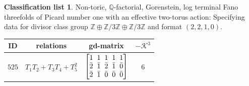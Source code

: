 \documentclass[pdftex]{sigma}%
\theoremstyle{definition}
\newtheorem{class-list}[thm]{Classification list}
\def\ZZ{{\mathbb Z}}
\def\QQ{{\mathbb Q}}
\numberwithin{equation}{section}
\begin{document}
\begin{class-list}\label{class-list(0,3,3)}
Non-toric, $\QQ$-factorial, Gorenstein, log terminal Fano
threefolds of Picard number one with an effective two-torus action:
Specifying data for divisor class group
$\ZZ\oplus \ZZ/3\ZZ\oplus \ZZ/3\ZZ$ and format $(2,2,1,0)$.
\begin{table}[h!]\centering\setlength{\tabcolsep}{5.5pt}
\renewcommand{\arraystretch}{1.35}\small\tabulinesep=1mm
\begin{tabu}{c|c|c|c}
\hline
ID&relations&gd-matrix&$-\mathcal{K}^3$
\\
\hline
${525}$&${T_{1}T_{2}+T_{3}T_{4}+T_{5}^{2}}$
&$\arraycolsep=1mm\begin{bmatrix}{1} & {1} & {1} & {1} & {1} \\ {\bar{2}} & {\bar{1}} & {\bar{2}} & {\bar{1}} & {\bar{0}} \\ {\bar{2}} & {\bar{1}} & {\bar{0}} & {\bar{0}} & {\bar{0}}\end{bmatrix}$
&${6}$
\\
\hline
\end{tabu}\vspace{4mm}
\end{table}
\end{class-list}
\end{document}
